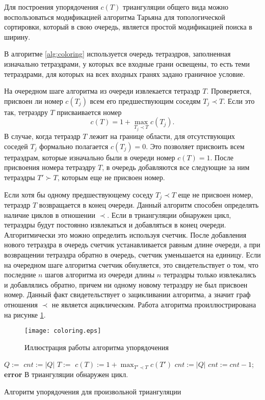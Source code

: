 Для построения упорядочения $c(T)$ триангуляции общего вида можно воспользоваться модификацией алгоритма Тарьяна \cite{Corman2009} для топологической сортировки, который в свою очередь, является простой модификацией поиска в ширину.

В алгоритме \ref{alg:coloring} используется очередь тетраэдров, заполненная изначально тетраэдрами, у которых все входные грани освещены, то есть теми тетраэдрами, для которых на всех входных гранях задано граничное условие.

На очередном шаге алгоритма из очереди извлекается тетраэдр $T$. Проверяется, присвоен ли номер $c(T_j)$ всем его предшествующим соседям $T_j \prec T$. Если это так, тетраэдру $T$ присваивается номер
\[
c(T) = 1 + \max_{T_j \prec T} c(T_j).
\]
В случае, когда тетраэдр $T$ лежит на границе области, для отсутствующих соседей $T_j$ формально полагается $c(T_j) = 0$. Это позволяет присвоить всем тетраэдрам, которые изначально были в очереди номер $c(T) = 1$. После присвоения номера тетраэдру $T$, в очередь добавляются все следующие за ним тетраэдры $T' \succ T$, которым еще не присвоен номер.

Если хотя бы одному предшествующему соседу $T_j \prec T$ еще не присвоен номер, тетраэдр $T$ возвращается в конец очереди. Данный алгоритм способен определять наличие циклов в отношении $\prec$. Если в триангуляции обнаружен цикл, тетраэдры будут постоянно извлекаться и добавляться в конец очереди. Алгоритмически это можно определить используя счетчик. После добавления нового тетраэдра в очередь счетчик устанавливается равным длине очереди, а при возвращении тетраэдра обратно в очередь, счетчик уменьшается на единицу. Если на очередном шаге алгоритма счетчик обнуляется, это свидетельствует о том, что последние $n$ шагов алгоритма из очереди длины $n$ тетраэдры только извлекались и добавлялись обратно, причем ни одному новому тетраэдру не был присвоен номер. Данный факт свидетельствует о зацикливании алгоритма, а значит граф отношения $\prec$ не является ациклическим. Работа алгоритма проиллюстрирована на рисунке \ref{fig:coloring}.
\begin{figure}[ht!]
\centering
\texttt{[image: coloring.eps]}
\caption{Иллюстрация работы алгоритма упорядочения}
\label{fig:coloring}
\end{figure}

\begin{algorithm}[ht!]
\centering
\begin{algorithmic}[1]
\State $Q :=$ 
\State $cnt := |Q|$
\State $T :=$ 
\State $c(T) := 1 + \max_{T' \prec T} c(T')$
\State {}
\EndFor
\State $cnt := |Q|$
\Else
\State {}
\State $cnt := cnt - 1$;
\EndIf
{}
\State \textbf{error} В триангуляции обнаружен цикл.
\EndIf
\EndWhile
\EndProcedure
\end{algorithmic}
\caption{Алгоритм упорядочения для произвольной триангуляции}
\label{alg:coloring}
\end{algorithm}

